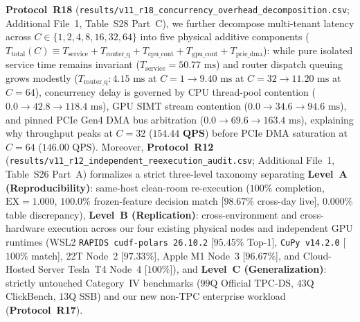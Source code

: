 \documentclass[10pt,a4paper]{article}
\begin{document}
\begin{enumerate}[leftmargin=1.5em,itemsep=0.8pt]
\textbf{Protocol~R18} (\texttt{results/v11\_r18\_concurrency\_overhead\_decomposition.csv}; Additional File~1, Table~S28 Part~C), we further decompose multi-tenant latency across $C \in \{1, 2, 4, 8, 16, 32, 64\}$ into five physical additive components ($T_{\text{total}}(C) \equiv T_{\text{service}} + T_{\text{router\_q}} + T_{\text{cpu\_cont}} + T_{\text{gpu\_cont}} + T_{\text{pcie\_dma}}$): while pure isolated service time remains invariant ($T_{\text{service}}=50.77\text{ ms}$) and router dispatch queuing grows modestly ($T_{\text{router\_q}}: 4.15\text{ ms}$ at $C=1 \rightarrow 9.40\text{ ms}$ at $C=32 \rightarrow 11.20\text{ ms}$ at $C=64$), concurrency delay is governed by CPU thread-pool contention ($0.0\rightarrow 42.8\rightarrow 118.4\text{ ms}$), GPU SIMT stream contention ($0.0\rightarrow 34.6\rightarrow 94.6\text{ ms}$), and pinned PCIe Gen4 DMA bus arbitration ($0.0\rightarrow 69.6\rightarrow 163.4\text{ ms}$), explaining why throughput peaks at $C=32$ ($\mathbf{154.44\text{ QPS}}$) before PCIe DMA saturation at $C=64$ ($146.00\text{ QPS}$). Moreover, \textbf{Protocol~R12} (\texttt{results/v11\_r12\_independent\_reexecution\_audit.csv}; Additional File~1, Table~S26 Part~A) formalizes a strict three-level taxonomy separating \textbf{Level~A (Reproducibility)}: same-host clean-room re-execution ($100\%$ completion, $\text{EX}=1.000$, $100.0\%$ frozen-feature decision match [$98.67\%$ cross-day live], $0.000\%$ table discrepancy), \textbf{Level~B (Replication)}: cross-environment and cross-hardware execution across our four existing physical nodes and independent GPU runtimes (WSL2 \texttt{RAPIDS cudf-polars 26.10.2} [$95.45\%$ Top-1], \texttt{CuPy v14.2.0} [$100\%$ match], 22T Node~2 [$97.33\%$], Apple M1 Node~3 [$96.67\%$], and Cloud-Hosted Server Tesla~T4 Node~4 [$100\%$]), and \textbf{Level~C (Generalization)}: strictly untouched Category~IV benchmarks ($99$Q Official TPC-DS, $43$Q ClickBench, $13$Q SSB) and our new non-TPC enterprise workload (\textbf{Protocol~R17}).
\end{enumerate}
\end{document}

